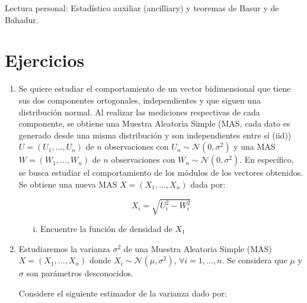 \begin{remark}
Lectura personal: Estadístico auxiliar (ancilliary) y teoremas de Basur y de Bahadur. 
\end{remark}
\section{Ejercicios}

\begin{enumerate}
    \item Se quiere estudiar el comportamiento de un vector bidimensional que tiene sus dos componentes ortogonales, independientes y que siguen una distribución normal. Al realizar las mediciones respectivas de cada componente, se obtiene una Muestra Aleatoria Simple (MAS, cada dato es generado desde una misma distribución y son independientes entre sí (iid)) $U=(U_1,...,U_n)$ de $n$ observaciones con $U_n\sim\mathcal{N}(0,\sigma^2)$  y una MAS $W=(W_1,...,W_n)$  de $n$ observaciones con $W_n\sim\mathcal{N}(0,\sigma^2)$. En específico, se busca estudiar el comportamiento de los módulos de los vectores obtenidos. Se obtiene una nueva MAS $X=(X_1,...,X_n)$ dada por:

\[X_i = \sqrt{U_i^2 - W_i^2}\]

\begin{enumerate}
    \item [i.] Encuentre la función de densidad de $X_1$\\
\end{enumerate}

\item Estudiaremos la varianza $\sigma^2$ de una Muestra Aleatoria Simple (MAS) $X=(X_1,...,X_n)$ donde $X_i\sim\mathcal{N}(\mu, \sigma^2)$, $\forall i =1,...,n$. Se considera que $\mu$ y $\sigma$ son parámetros desconocidos. 

Considere el siguiente estimador de la varianza dado por:


\end{enumerate}
